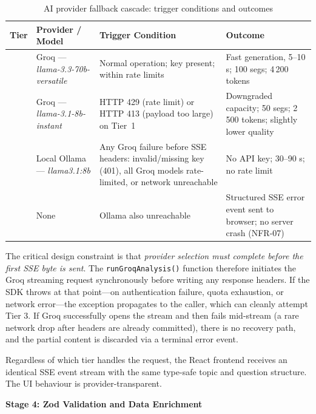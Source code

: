 \begin{table}[H]
  \centering
  \small
  \begin{tabularx}{\linewidth}{
    >{\centering\arraybackslash}p{0.8cm}
    >{\raggedright\arraybackslash}p{4.8cm}
    >{\raggedright\arraybackslash}X
    >{\raggedright\arraybackslash}p{3.5cm}}
    \toprule
    \textbf{Tier} & \textbf{Provider / Model} & \textbf{Trigger Condition} & \textbf{Outcome} \\
    \midrule
    1 & Groq --- \textit{llama-3.3-70b-versatile} & Normal operation; key present; within rate limits & Fast generation, 5--10 s; 100 segs; 4\,200 tokens \\
    \addlinespace
    2 & Groq --- \textit{llama-3.1-8b-instant} & HTTP 429 (rate limit) or HTTP 413 (payload too large) on Tier~1 & Downgraded capacity; 50 segs; 2\,500 tokens; slightly lower quality \\
    \addlinespace
    3 & Local Ollama --- \textit{llama3.1:8b} & Any Groq failure before SSE headers: invalid/missing key (401), all Groq models rate-limited, or network unreachable & No API key; 30--90 s; no rate limit \\
    \addlinespace
    4 & None & Ollama also unreachable & Structured SSE error event sent to browser; no server crash (NFR-07) \\
    \bottomrule
  \end{tabularx}
  \caption{AI provider fallback cascade: trigger conditions and outcomes}
  \label{tab:fallback}
\end{table}

The critical design constraint is that \emph{provider selection must complete before the first SSE byte is sent}. The \texttt{runGroqAnalysis()} function therefore initiates the Groq streaming request synchronously before writing any response headers. If the SDK throws at that point---on authentication failure, quota exhaustion, or network error---the exception propagates to the caller, which can cleanly attempt Tier 3. If Groq successfully opens the stream and then fails mid-stream (a rare network drop after headers are already committed), there is no recovery path, and the partial content is discarded via a terminal error event.

Regardless of which tier handles the request, the React frontend receives an identical SSE event stream with the same type-safe topic and question structure. The UI behaviour is provider-transparent.

\textbf{Stage 4: Zod Validation and Data Enrichment}

